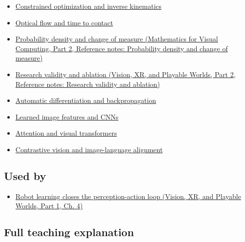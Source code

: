 \hypertarget{appendix-b0c42da325f1-prerequisites}{}

\begin{itemize}
\tightlist
\item
  \hyperref[appendix-29f4bea4c2bb]{Constrained optimization and inverse kinematics}
\item
  \hyperref[appendix-e2e73f8cd93e]{Optical flow and time to contact}
\item
  \href{../02-Mathematics-for-Visual-Computing-P02/main.pdf\#appendix-4815cd87ab8b}{Probability density and change of measure (Mathematics for Visual Computing, Part 2, Reference notes: Probability density and change of measure)}
\item
  \href{../07-Vision-XR-and-Playable-Worlds-P02/main.pdf\#appendix-65788587ef78}{Research validity and ablation (Vision, XR, and Playable Worlds, Part 2, Reference notes: Research validity and ablation)}
\item
  \hyperref[appendix-40df0855b4a7]{Automatic differentiation and backpropagation}
\item
  \hyperref[appendix-47c51ea026fb]{Learned image features and CNNs}
\item
  \hyperref[appendix-a9d5dfdd164a]{Attention and visual transformers}
\item
  \hyperref[appendix-772f1fd96148]{Contrastive vision and image-language alignment}
\end{itemize}

\subsection{Used by}\label{appendix-b0c42da325f1-used-by}

\hypertarget{appendix-b0c42da325f1-used-by}{}

\begin{itemize}
\tightlist
\item
  \href{../07-Vision-XR-and-Playable-Worlds-P01/main.pdf\#04-visual-computing-ii-ch034-robot-learning-closes-the-perception-action-loop}{Robot learning closes the perception-action loop (Vision, XR, and Playable Worlds, Part 1, Ch. 4)}
\end{itemize}

\subsection{Full teaching explanation}\label{appendix-b0c42da325f1-full-teaching-explanation}

\hypertarget{appendix-b0c42da325f1-full-teaching-explanation}{}

